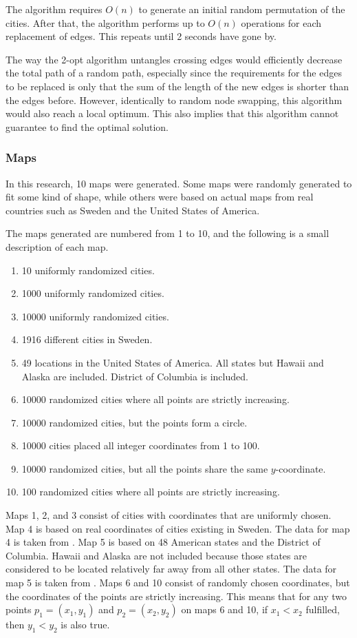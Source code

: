 \documentclass{article}
\begin{document}
\noindent
The algorithm requires $O(n)$ to generate an initial random permutation of the cities. After that, the algorithm performs up to $O(n)$ operations for each replacement of edges. This repeats until 2 seconds have gone by.

\noindent
The way the 2-opt algorithm untangles crossing edges would efficiently decrease the total path of a random path, especially since the requirements for the edges to be replaced is only that the sum of the length of the new edges is shorter than the edges before. However, identically to random node swapping, this algorithm would also reach a local optimum. This also implies that this algorithm cannot guarantee to find the optimal solution.


\subsubsection{Maps}\label{maps}
In this research, 10 maps were generated. Some maps were randomly generated to fit some kind of shape, while others were based on actual maps from real countries such as Sweden and the United States of America.

\noindent
The maps generated are numbered from 1 to 10, and the following is a small description of each map.

\begin{enumerate}
  \item 10 uniformly randomized cities.
  \item 1000 uniformly randomized cities.
  \item 10000 uniformly randomized cities.
  \item 1916 different cities in Sweden.
  \item 49 locations in the United States of America. All states but Hawaii and Alaska are included. District of Columbia is included.
  \item 10000 randomized cities where all points are strictly increasing. 
  \item 10000 randomized cities, but the points form a circle.
  \item 10000 cities placed all integer coordinates from 1 to 100.
  \item 10000 randomized cities, but all the points share the same $y$-coordinate.
  \item 100 randomized cities where all points are strictly increasing.
\end{enumerate}

\noindent
Maps 1, 2, and 3 consist of cities with coordinates that are uniformly chosen. Map 4 is based on real coordinates of cities existing in Sweden. The data for map 4 is taken from . Map 5 is based on 48 American states and the District of Columbia. Hawaii and Alaska are not included because those states are considered to be located relatively far away from all other states. The data for map 5 is taken from . Maps 6 and 10 consist of randomly chosen coordinates, but the coordinates of the points are strictly increasing. This means that for any two points $p_1 = (x_1,y_1)$ and $p_2=(x_2,y_2)$ on maps 6 and 10, if $x_1 < x_2$ fulfilled, then $y_1 < y_2$ is also true.
\end{document}
